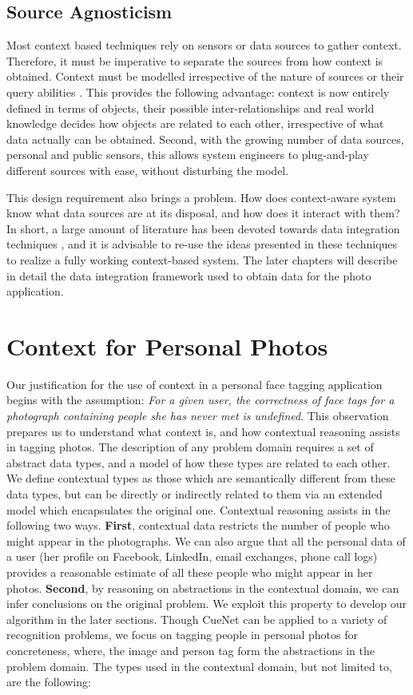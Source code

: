 \subsection{Source Agnosticism}
Most context based techniques rely on sensors or data sources to gather context. Therefore, it must be imperative to separate the sources from how context is obtained. Context must be modelled irrespective of the nature of sources or their query abilities \cite{yerneni1999computing}. This provides the following advantage: context is now entirely defined in terms of objects, their possible inter-relationships and real world knowledge decides how objects are related to each other, irrespective of what data actually can be obtained. Second, with the growing number of data sources, personal and public sensors, this allows system engineers to plug-and-play different sources with ease, without disturbing the model. 

This design requirement also brings a problem. How does context-aware system know what data sources are at its disposal, and how does it interact with them? In short, a large amount of literature has been devoted towards data integration techniques \cite{doan2005semantic, halevy2001answering, lenzerini2002data}, and it is advisable to re-use the ideas presented in these techniques to realize a fully working context-based system. The later chapters will describe in detail the data integration framework used to obtain data for the photo application.

\section{Context for Personal Photos}
Our justification for the use of context in a personal face tagging application begins with the assumption: \textit{For a given user, the correctness of face tags for a photograph containing people she has never met is undefined}. This observation prepares us to understand what context is, and how contextual reasoning assists in tagging photos. The description of any problem domain requires a set of abstract data types, and a model of how these types are related to each other. We define contextual types as those which are semantically different from these data types, but can be directly or indirectly related to them via an extended model which encapsulates the original one. Contextual reasoning assists in the following two ways. \textbf{First}, contextual data restricts the number of people who might appear in the photographs. We can also argue that all the personal data of a user (her profile on Facebook, LinkedIn, email exchanges, phone call logs) provides a reasonable estimate of all these people who might appear in her photos. \textbf{Second}, by reasoning on abstractions in the contextual domain, we can infer conclusions on the original problem. We exploit this property to develop our algorithm in the later sections. Though CueNet can be applied to a variety of recognition problems, we focus on tagging people in personal photos for concreteness, where, the image and person tag form the abstractions in the problem domain. The types used in the contextual domain, but not limited to, are the following:

